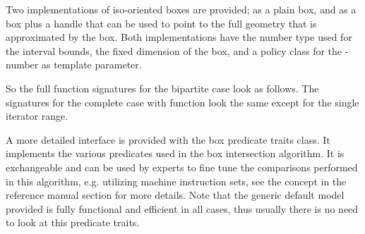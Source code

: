 Two implementations of iso-oriented boxes are provided;
 as a plain box, and 
 as a box plus a
handle that can be used to point to the full geometry that is
approximated by the box. Both implementations have the number type
used for the interval bounds, the fixed dimension of the box, and a
policy class \cite{cgal:a-mcdgp-01} for the -number as
template parameter. 

So the full function signatures for the bipartite case look as
follows. The signatures for the complete case with
 function look the same except for the
single iterator range.


 


\begin{ccAdvanced}
  A more detailed interface is provided with the box predicate traits
  class. It implements the various predicates used in the box
  intersection algorithm. It is exchangeable and can be used by
  experts to fine tune the comparisons performed in this algorithm,
  e.g. utilizing machine instruction sets, see the
   concept in the reference
  manual section for more details. Note that the generic default model
  provided is fully functional and efficient in all cases, thus
  usually there is no need to look at this predicate traits.
\end{ccAdvanced}



